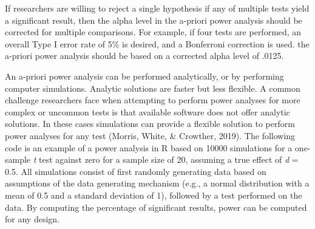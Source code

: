 \documentclass[
  english,
  ,jou, a4paper,floatsintext]{apa6}
\newenvironment{Shaded}{\begin{snugshade}}{\end{snugshade}}
\newcommand{\AttributeTok}[1]{\textcolor[rgb]{0.77,0.63,0.00}{#1}}
\newcommand{\ControlFlowTok}[1]{\textcolor[rgb]{0.13,0.29,0.53}{\textbf{#1}}}
\newcommand{\DecValTok}[1]{\textcolor[rgb]{0.00,0.00,0.81}{#1}}
\newcommand{\FloatTok}[1]{\textcolor[rgb]{0.00,0.00,0.81}{#1}}
\newcommand{\FunctionTok}[1]{\textcolor[rgb]{0.00,0.00,0.00}{#1}}
\newcommand{\NormalTok}[1]{#1}
\newcommand{\OtherTok}[1]{\textcolor[rgb]{0.56,0.35,0.01}{#1}}
\newcommand{\SpecialCharTok}[1]{\textcolor[rgb]{0.00,0.00,0.00}{#1}}
\begin{document}
If researchers are willing to reject a single hypothesis if any of multiple tests yield a significant result, then the alpha level in the a-priori power analysis should be corrected for multiple comparisons. For example, if four tests are performed, an overall Type I error rate of 5\% is desired, and a Bonferroni correction is used. the a-priori power analysis should be based on a corrected alpha level of .0125.

An a-priori power analysis can be performed analytically, or by performing computer simulations. Analytic solutions are faster but less flexible. A common challenge researchers face when attempting to perform power analyses for more complex or uncommon tests is that available software does not offer analytic solutions. In these cases simulations can provide a flexible solution to perform power analyses for any test (Morris, White, \& Crowther, 2019). The following code is an example of a power analysis in R based on 10000 simulations for a one-sample \emph{t} test against zero for a sample size of 20, assuming a true effect of \emph{d} = 0.5. All simulations consist of first randomly generating data based on assumptions of the data generating mechanism (e.g., a normal distribution with a mean of 0.5 and a standard deviation of 1), followed by a test performed on the data. By computing the percentage of significant results, power can be computed for any design.

\begin{Shaded}
\end{Shaded}
\end{document}
